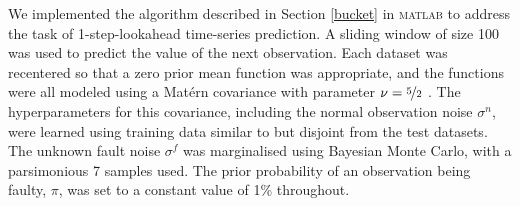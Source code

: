 \documentclass[letterpaper]{article}
\begin{document}
We implemented the algorithm described in Section \ref{bucket} in
\textsc{matlab} to address the task of 1-step-lookahead time-series
prediction.  A sliding window of size 100 was used to predict the
value of the next observation.  Each dataset was recentered so that a
zero prior mean function was appropriate, and the functions were all
modeled using a Mat\'{e}rn covariance with parameter $\nu =
\nicefrac{5}{2}$ \cite{gpml}.  The hyperparameters for this
covariance, including the normal observation noise
$\sigma^n$, were learned using training data similar to but disjoint from the test datasets.  The unknown fault noise $\sigma^f$
was marginalised using Bayesian Monte Carlo, with a parsimonious 7 samples used.  The prior probability of an observation being faulty, $\pi$, was
set to a constant value of 1\% throughout.
\end{document}

